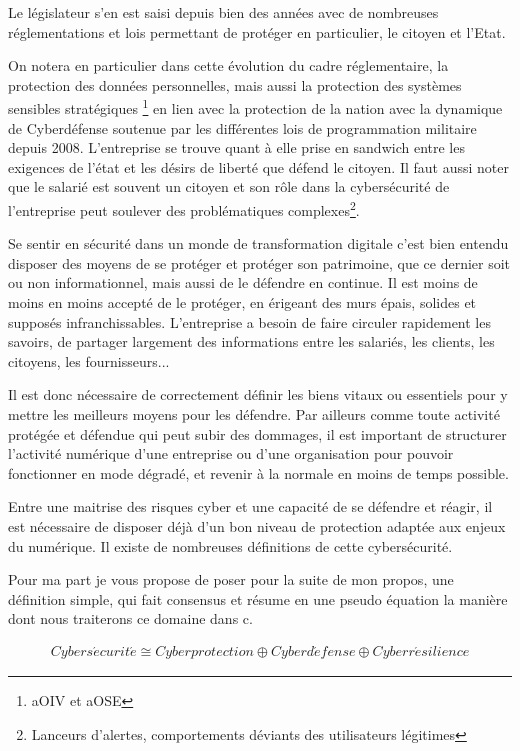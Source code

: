 Le législateur s'en est saisi depuis bien des années avec de nombreuses réglementations et lois permettant de protéger en particulier, le citoyen et l'Etat.

On notera en particulier dans cette évolution du cadre réglementaire,  la protection des données personnelles, mais aussi la protection des systèmes sensibles stratégiques \footnote{\gls{aOIV}  et \gls{aOSE} } en lien avec la protection de la nation avec la dynamique de Cyberdéfense soutenue par les différentes lois de programmation militaire depuis 2008. L'entreprise se trouve quant à elle prise en sandwich entre les exigences de l'état et les désirs de liberté que défend le citoyen. Il faut aussi noter que le salarié est souvent un citoyen et son rôle dans la cybersécurité de l'entreprise peut soulever des problématiques complexes\footnote{Lanceurs d'alertes, comportements déviants des utilisateurs légitimes}.
 
Se sentir en sécurité dans un monde de transformation digitale c'est bien entendu disposer des moyens de se protéger et protéger son patrimoine, que ce dernier soit ou non informationnel, mais aussi de le défendre en continue. Il est moins de moins en moins accepté de le protéger, en érigeant des murs épais, solides et supposés infranchissables. L'entreprise a besoin de faire circuler rapidement les savoirs, de partager largement des informations entre les salariés, les clients, les citoyens, les fournisseurs...


Il est donc nécessaire de correctement définir les biens vitaux ou essentiels pour y mettre les meilleurs moyens pour les défendre. Par ailleurs comme toute activité protégée et défendue qui peut subir des dommages, il est important de structurer l'activité numérique d'une entreprise ou d'une organisation pour pouvoir fonctionner en mode dégradé, et revenir à la normale en moins de temps possible.


Entre une maitrise des risques cyber et une capacité de se défendre et réagir, il est nécessaire de disposer déjà d'un bon niveau de protection adaptée aux enjeux du numérique. Il existe de nombreuses définitions de cette cybersécurité.

Pour ma part je vous propose de poser pour la suite de mon propos, une définition simple, qui fait consensus et résume en une pseudo équation la manière dont nous traiterons ce domaine dans c\ecours. \\
\begin{nota}
\begin{align}
Cybers\acute{e}curit\acute{e} \cong Cyberprotection\oplus Cyberd\acute{e}fense \oplus Cyberr\acute{e}silience
\end{align}
\end{nota}


